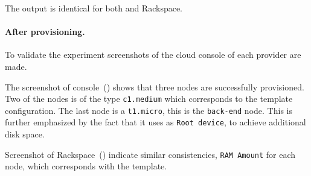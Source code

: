 The output is identical for both  and Rackspace.

\paragraph{After provisioning.}



To validate the experiment screenshots of the cloud console of each provider are made.

The screenshot of  console~() shows that three nodes
are successfully provisioned.
Two of the nodes is of the type \texttt{c1.medium} which corresponds to the template configuration.
The last node is a \texttt{t1.micro}, \ie this is the \texttt{back-end} node.
This is further emphasized by the fact that it uses  as \texttt{Root device},
to achieve additional disk space.

Screenshot of Rackspace~() indicate similar consistencies,
\eg \texttt{RAM Amount} for each node, which corresponds with the template.
